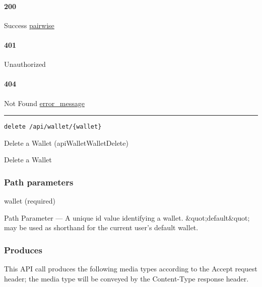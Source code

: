 \hypertarget{section-599}{%
\paragraph{200}\label{section-599}}

Success \protect\hyperlink{pairwise}{pairwise}

\hypertarget{section-600}{%
\paragraph{401}\label{section-600}}

Unauthorized \protect\hyperlink{}{}

\hypertarget{section-601}{%
\paragraph{404}\label{section-601}}

Not Found \protect\hyperlink{error_message}{error\_message}

\begin{center}\rule{0.5\linewidth}{\linethickness}\end{center}

\protect\hypertarget{apiWalletWalletDelete}{}{}

\begin{verbatim}
delete /api/wallet/{wallet}
\end{verbatim}

Delete a Wallet ({apiWalletWalletDelete})

Delete a Wallet

\hypertarget{path-parameters-102}{%
\subsubsection{Path parameters}\label{path-parameters-102}}

wallet (required)

{Path Parameter} --- A unique id value identifying a wallet.
\&quot;default\&quot; may be used as shorthand for the current user's
default wallet.

\hypertarget{produces-181}{%
\subsubsection{Produces}\label{produces-181}}

This API call produces the following media types according to the
{Accept} request header; the media type will be conveyed by the
{Content-Type} response header.

